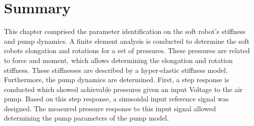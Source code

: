 \section*{Summary} 

This chapter comprised the parameter identification on the soft robot's stiffness and pump dynamics. A finite element analysis is conducted to determine the soft robots elongation and rotations for a set of pressures. These pressures are related to force and moment, which allows determining the elongation and rotation stiffness. These stiffnesses are described by a hyper-elastic stiffness model. Furthermore, the pump dynamics are determined. First, a step response is conducted which showed achievable pressures given an input Voltage to the air pump. Based on this step response, a sinusoidal input reference signal was designed. The measured pressure response to this input signal allowed determining the pump parameters of the pump model. 


